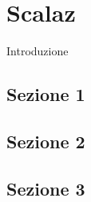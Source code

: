 \chapter{Scalaz} %

\label{Chapter1} %

Introduzione


\section{Sezione 1}


\section{Sezione 2}


\section{Sezione 3}
